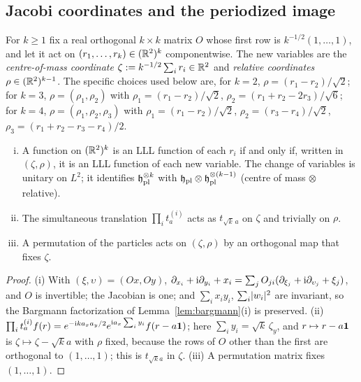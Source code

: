 \subsection{Jacobi coordinates and the periodized image}

For $k\ge1$ fix a real orthogonal $k\times k$ matrix $O$ whose first row is $k^{-1/2}(1,\dots,1)$, and let it act on
$(r_1,\dots,r_k)\in(\mathbb{R}^2)^k$ componentwise. The new variables are the \emph{centre-of-mass coordinate}
$\zeta:=k^{-1/2}\sum_ir_i\in\mathbb{R}^2$ and \emph{relative coordinates} $\rho\in(\mathbb{R}^2)^{k-1}$. The specific choices used below
are, for $k=2$, $\rho=(r_1-r_2)/\sqrt2$; for $k=3$, $\rho=(\rho_1,\rho_2)$ with $\rho_1=(r_1-r_2)/\sqrt2$,
$\rho_2=(r_1+r_2-2r_3)/\sqrt6$; for $k=4$, $\rho=(\rho_1,\rho_2,\rho_3)$ with $\rho_1=(r_1-r_2)/\sqrt2$,
$\rho_2=(r_3-r_4)/\sqrt2$, $\rho_3=(r_1+r_2-r_3-r_4)/2$.

\begin{lemma}\label{lem:jacobi}
\begin{enumerate}[(i)]
\item A function on $(\mathbb{R}^2)^k$ is an LLL function of each $r_i$ if and only if, written in $(\zeta,\rho)$, it is an LLL
function of each new variable. The change of variables is unitary on $L^2$; it identifies
$\mathfrak{h}_{\mathrm{pl}}^{\otimes k}$ with $\mathfrak{h}_{\mathrm{pl}}\otimes\mathfrak{h}_{\mathrm{pl}}^{\otimes(k-1)}$ (centre of mass $\otimes$ relative).
\item The simultaneous translation $\prod_it^{(i)}_a$ acts as $t_{\sqrt k\,a}$ on $\zeta$ and trivially on $\rho$.
\item A permutation of the particles acts on $(\zeta,\rho)$ by an orthogonal map that fixes $\zeta$.
\end{enumerate}
\end{lemma}

\begin{proof}
(i) With $(\xi,\upsilon)=(Ox,Oy)$, $\partial_{x_i}+\mathrm{i}\partial_{y_i}+x_i=\sum_jO_{ji}(\partial_{\xi_j}+\mathrm{i}\partial_{\upsilon_j}+\xi_j)$, and $O$ is
invertible; the Jacobian is one; and $\sum_ix_iy_i$, $\sum_i\lvert w_i\rvert^2$ are invariant, so the Bargmann factorization of
Lemma~\ref{lem:bargmann}(i) is preserved. (ii) $\prod_it_a^{(i)}f(r)=e^{-\mathrm{i} ka_xa_y/2}e^{\mathrm{i} a_x\sum_iy_i}f(r-a\mathbf{1})$; here
$\sum_iy_i=\sqrt k\,\zeta_y$, and $r\mapsto r-a\mathbf{1}$ is $\zeta\mapsto\zeta-\sqrt ka$ with $\rho$ fixed, because the rows of
$O$ other than the first are orthogonal to $(1,\dots,1)$; this is $t_{\sqrt ka}$ in $\zeta$. (iii) A permutation matrix
fixes $(1,\dots,1)$.
\end{proof}

